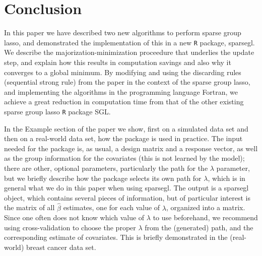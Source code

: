 \documentclass[12pt]{article}
\newcommand{\pkg}[1]{{\normalfont\fontseries{b}\selectfont #1}}
\begin{document}



\section{Conclusion}

In this paper we have described two new algorithms to perform sparse group lasso, and demonstrated the implementation of this in a new \texttt{R} package, \pkg{sparsegl}. We describe the majorization-minimization proceedure that underlies the update step, and explain how this results in computation savings and also why it converges to a global minimum. By modifying and using the discarding rules (sequential strong rule) from the paper \citep{tibshirani2012strong} in the context of the sparse group lasso, and implementing the algorithms in the programming language Fortran, we achieve a great reduction in computation time from that of the other existing sparse group lasso \texttt{R} package \pkg{SGL}. 

In the Example section of the paper we show, first on a simulated data set and then on a real-world data set, how the package is used in practice. The input needed for the package is, as usual, a design matrix and a response vector, as well as the group information for the covariates (this is not learned by the model); there are other, optional parameters, particularly the path for the $\lambda$ parameter, but we briefly describe how the package selects its own path for $\lambda$, which is in general what we do in this paper when using \pkg{sparsegl}. The output is a sparsegl object, which contains several pieces of information, but of particular interest is the matrix of all $\hat{\beta}$ estimates, one for each value of $\lambda$, organized into a matrix. Since one often does not know which value of $\lambda$ to use beforehand, we recommend using cross-validation to choose the proper $\lambda$ from the (generated) path, and the corresponding estimate of covariates. This is briefly demonstrated in the (real-world) breast cancer data set.
\end{document}

